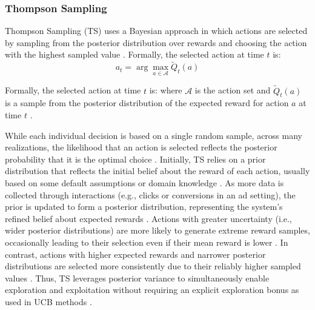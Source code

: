 \documentclass[final]{anthology-ch}         %
\begin{document}
\subsubsection{\textbf{Thompson Sampling}} Thompson Sampling (TS) uses a Bayesian approach in which actions are selected by sampling from the posterior distribution over rewards and choosing the action with the highest sampled value \cite{Sutton1998, russo2018tutorial}.  Formally, the selected action at time $t$ is:
\begin{equation}
a_t = \arg\max_{a \in \mathcal{A}} \tilde{Q}_t(a)
\label{eq:ts}
\end{equation}

Formally, the selected action at time $t$ is:
where $\mathcal{A}$ is the action set and $\tilde{Q}_t(a)$ is a sample from the posterior distribution of the expected reward for action $a$ at time $t$ \cite{russo2018tutorial}.

While each individual decision is based on a single random sample, across many realizations, the likelihood that an action is selected reflects the posterior probability that it is the optimal choice \cite{russo2018tutorial}. Initially, TS relies on a prior distribution that reflects the initial belief about the reward of each action, usually based on some default assumptions or domain knowledge \cite{russo2018tutorial}. As more data is collected through interactions (e.g., clicks or conversions in an ad setting), the prior is updated to form a posterior distribution, representing the system’s refined belief about expected rewards \cite{russo2018tutorial}. Actions with greater uncertainty (i.e., wider posterior distributions) are more likely to generate extreme reward samples, occasionally leading to their selection even if their mean reward is lower \cite{russo2018tutorial}. In contrast, actions with higher expected rewards and narrower posterior distributions are selected more consistently due to their reliably higher sampled values \cite{russo2018tutorial}. Thus, TS leverages posterior variance to simultaneously enable exploration and exploitation without requiring an explicit exploration bonus as used in UCB methods \cite{russo2018tutorial}. \\
\end{document}
